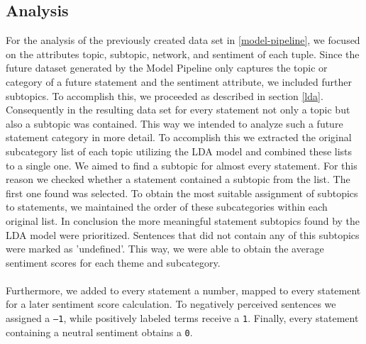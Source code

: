 \subsection{Analysis}
For the analysis of the previously created data set in \ref{model-pipeline}, we focused on the attributes topic, subtopic, network, and sentiment of each tuple.
Since the future dataset generated by the Model Pipeline only captures the topic or category of a future statement and the sentiment attribute, we included further subtopics.
To accomplish this, we proceeded as described in section \ref{lda}.
Consequently in the resulting data set for every statement not only a topic but also a subtopic was contained.
This way we intended to analyze such a future statement category in more detail.
To accomplish this we extracted the original subcategory list of each topic utilizing the LDA model and combined these lists to a single one. We aimed to find a subtopic for almost every statement.
For this reason we checked whether a statement contained a subtopic from the list.
The first one found was selected.
To obtain the most suitable assignment of subtopics to statements, we maintained the order of these subcategories within each original list.
In conclusion the more meaningful statement subtopics found by the LDA model were prioritized. Sentences that did not contain any of this subtopics were marked as 'undefined'.
This way, we were able to obtain the average sentiment scores for each theme and subcategory.
\\
\\
Furthermore, we added to every statement a number, mapped to every statement for a later sentiment score calculation. To negatively perceived sentences we assigned a \texttt{–1}, while positively labeled terms receive a \texttt{1}. Finally, every statement containing a neutral sentiment obtains a \texttt{0}.
